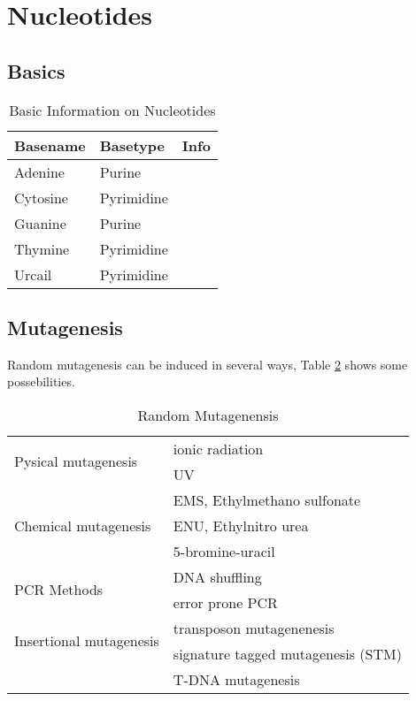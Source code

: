 \section{Nucleotides}
\subsection{Basics}
\begin{table}[h!]
	\centering
	\begin{tabular}{l l l}
		\toprule
		Basename		&	Basetype		& Info \\
		\midrule 
		Adenine		&	Purine		&	\\
		Cytosine		&	Pyrimidine	&	\\
		Guanine		&	Purine		&	\\
		Thymine		&	Pyrimidine	&	\\
		Urcail		&	Pyrimidine	&	\\
		\bottomrule
	\end{tabular}
	\caption{Basic Information on Nucleotides}
	\label{tab:nucleotides}
\end{table}

\subsection{Mutagenesis}

Random mutagenesis can be induced in several ways,
Table \ref{tab:mutagenesis} shows some possebilities.

\begin{table}
	\centering
	\begin{tabular}{l l}
		\toprule
		\multirow{2}{*}{Pysical mutagenesis}	&	ionic radiation \\
															&	UV \\		
		\midrule
		\multirow{3}{*}{Chemical mutagenesis}	&	EMS, Ethylmethano sulfonate \\
															&	ENU, Ethylnitro urea \\		
															&	5-bromine-uracil \\		
		\midrule
		\multirow{2}{*}{PCR Methods}				&	DNA shuffling \\
															&	error prone PCR \\		
		\midrule
		\multirow{2}{*}{Insertional mutagenesis}	&	transposon mutagenenesis \\
																&	signature tagged mutagenesis (STM) \\		
																&	T-DNA mutagenesis \\
		\bottomrule
	\end{tabular}
	\caption{Random Mutagenensis}
	\label{tab:mutagenesis}
\end{table}


